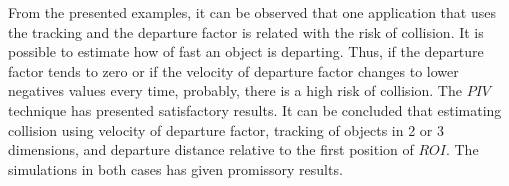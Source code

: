 From the presented examples,
it can be observed that one application that uses the tracking
and the departure factor is related with the risk of collision.
It is possible to estimate how of fast an object is departing.
Thus, if the  departure factor tends to zero or 
if the velocity of departure factor changes to lower negatives values every time, 
probably, there is a high risk of collision. The $PIV$ technique has presented satisfactory results. 
It can be concluded that estimating collision using velocity of departure factor, 
tracking of objects in 2 or 3 dimensions, and departure distance
relative to the first position of $ROI$. 
The simulations in both cases has given promissory results.
